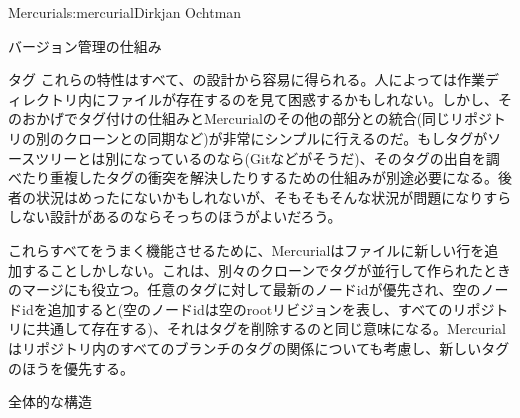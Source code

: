 \begin{aosachapter}{Mercurial}{s:mercurial}{Dirkjan Ochtman}
\begin{aosasect1}{バージョン管理の仕組み}
\begin{aosasect2}{タグ}
これらの特性はすべて、の設計から容易に得られる。人によっては作業ディレクトリ内にファイルが存在するのを見て困惑するかもしれない。しかし、そのおかげでタグ付けの仕組みとMercurialのその他の部分との統合(同じリポジトリの別のクローンとの同期など)が非常にシンプルに行えるのだ。もしタグがソースツリーとは別になっているのなら(Gitなどがそうだ)、そのタグの出自を調べたり重複したタグの衝突を解決したりするための仕組みが別途必要になる。後者の状況はめったにないかもしれないが、そもそもそんな状況が問題になりすらしない設計があるのならそっちのほうがよいだろう。

これらすべてをうまく機能させるために、Mercurialはファイルに新しい行を追加することしかしない。これは、別々のクローンでタグが並行して作られたときのマージにも役立つ。任意のタグに対して最新のノードidが優先され、空のノードidを追加すると(空のノードidは空のrootリビジョンを表し、すべてのリポジトリに共通して存在する)、それはタグを削除するのと同じ意味になる。Mercurialはリポジトリ内のすべてのブランチのタグの関係についても考慮し、新しいタグのほうを優先する。

\end{aosasect2}

\end{aosasect1}

\begin{aosasect1}{全体的な構造}


\end{aosasect1}
\end{aosachapter}
